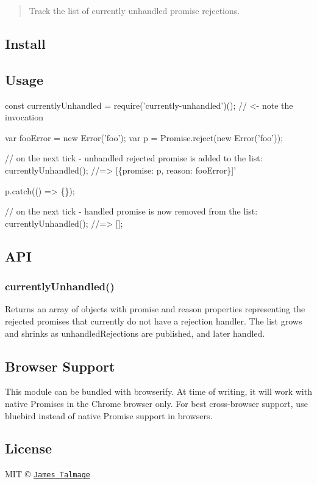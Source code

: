 \begin{quote}
Track the list of currently unhandled promise rejections. \end{quote}


\subsection*{Install}




\subsection*{Usage}


\begin{DoxyCode}
const currentlyUnhandled = require('currently-unhandled')(); // <- note the invocation

var fooError = new Error('foo');
var p = Promise.reject(new Error('foo'));

// on the next tick - unhandled rejected promise is added to the list:
currentlyUnhandled();
//=> [\{promise: p, reason: fooError\}]'

p.catch(() => \{\});

// on the next tick - handled promise is now removed from the list:
currentlyUnhandled();
//=> [];
\end{DoxyCode}


\subsection*{A\+PI}

\subsubsection*{currently\+Unhandled()}

Returns an array of objects with {\ttfamily promise} and {\ttfamily reason} properties representing the rejected promises that currently do not have a rejection handler. The list grows and shrinks as unhandled\+Rejections are published, and later handled.

\subsection*{Browser Support}

This module can be bundled with {\ttfamily browserify}. At time of writing, it will work with native Promises in the Chrome browser only. For best cross-\/browser support, use {\ttfamily bluebird} instead of native Promise support in browsers.

\subsection*{License}

M\+IT © \href{http://github.com/jamestalmage}{\tt James Talmage} 